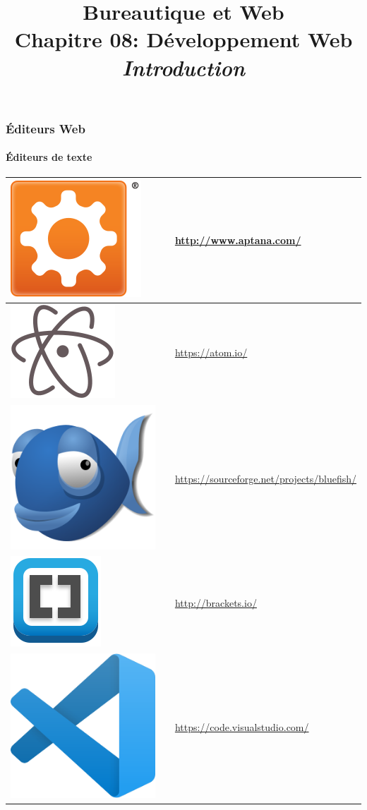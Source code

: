 \documentclass[xcolor=table]{beamer}
\title[BWEB: 08- Web (HTML)] %
{Bureautique et Web \\Chapitre 08: Développement Web\\ \slshape\small  Introduction}
\begin{document}
\begin{frame}
\frametitle{Éditeurs Web}
\framesubtitle{Éditeurs de texte}

\def\arraystretch{0}

\begin{tabular}{p{}cp{}}%
	
	\hline
	
	\includegraphics[height=.8cm]{..//img/Bweb08-dev-web/aptana-logo.png} &
	& 
	\url{http://www.aptana.com/}\\
	
	\hline
	
	\includegraphics[height=.8cm]{..//img/Bweb08-dev-web/atom-logo.png} &
	& 
	\url{https://atom.io/}\\
	
	\hline
	
	\includegraphics[height=.8cm]{..//img/Bweb08-dev-web/bluefish-logo.png} &
	& 
	\url{https://sourceforge.net/projects/bluefish/}\\
	
	\hline
	
	\includegraphics[height=.8cm]{..//img/Bweb08-dev-web/brackets-logo.png} &
	& 
	\url{http://brackets.io/}\\
	
	\hline
	
	\includegraphics[height=.8cm]{..//img/Bweb08-dev-web/visual-studio-code-logo.png} &
	& 
	\url{https://code.visualstudio.com/}\\
	
	\hline
	
\end{tabular}

\end{frame}
\end{document}

